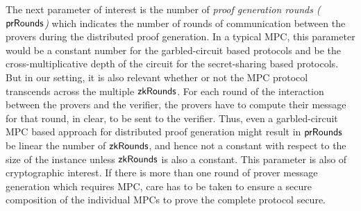 The next parameter of interest is the number of \textit{proof generation rounds ($\mathsf{prRounds}$)} which indicates the number of rounds of communication between the provers during the distributed proof generation. In a typical MPC, this parameter would be a constant number for the garbled-circuit based protocols and be the cross-multiplicative depth of the circuit for the secret-sharing based protocols. But in our setting, it is also relevant whether or not the MPC protocol transcends across the multiple $\mathsf{zkRounds}$. For each round of the interaction between the provers and the verifier, the provers have to compute their message for that round, in clear, to be sent to the verifier. Thus, even a garbled-circuit MPC based approach for distributed proof generation might result in $\mathsf{prRounds}$ be linear the number of $\mathsf{zkRounds}$, and hence not a constant with respect to the size of the instance unless $\mathsf{zkRounds}$ is also a constant.
This parameter is also of cryptographic interest. If there is more than one round of prover message generation which requires MPC, care has to be taken to ensure a secure composition of the individual MPCs to prove the complete protocol secure.

